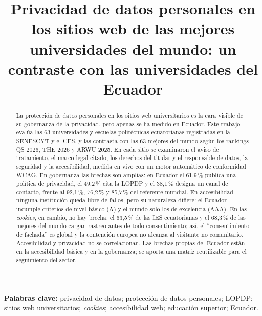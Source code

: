 \documentclass[11pt,a4paper]{article}
\title{\vspace{-1.2cm}\Large\textbf{Privacidad de datos personales en los sitios web de las mejores universidades del mundo: un contraste con las universidades del Ecuador}}
\author{}
\date{}
\begin{document}
\maketitle

\begin{abstract}
La protección de datos personales en los sitios web universitarios es la cara visible de su gobernanza de la privacidad, pero apenas se ha medido en Ecuador. Este trabajo evalúa las 63 universidades y escuelas politécnicas ecuatorianas registradas en la SENESCYT y el CES, y las contrasta con las 63 mejores del mundo según los rankings QS 2026, THE 2026 y ARWU 2025. En cada sitio se examinaron el aviso de tratamiento, el marco legal citado, los derechos del titular y el responsable de datos, la seguridad y la accesibilidad, medida en vivo con un motor automático de conformidad WCAG. En gobernanza las brechas son amplias: en Ecuador el 61,9\,\% publica una política de privacidad, el 49,2\,\% cita la LOPDP y el 38,1\,\% designa un canal de contacto, frente al 92,1\,\%, 76,2\,\% y 85,7\,\% del referente mundial. En accesibilidad ninguna institución queda libre de fallos, pero su naturaleza difiere: el Ecuador incumple criterios de nivel básico (A) y el mundo solo los de excelencia (AAA). En las \emph{cookies}, en cambio, no hay brecha: el 63,5\,\% de las IES ecuatorianas y el 68,3\,\% de las mejores del mundo cargan rastreo antes de todo consentimiento; así, el ``consentimiento de fachada'' es global y la contención europea no alcanza al visitante no comunitario. Accesibilidad y privacidad no se correlacionan. Las brechas propias del Ecuador están en la accesibilidad básica y en la gobernanza; se aporta una matriz reutilizable para el seguimiento del sector.
\end{abstract}

\noindent\textbf{Palabras clave:} privacidad de datos; protección de datos personales; LOPDP; sitios web universitarios; \emph{cookies}; accesibilidad web; educación superior; Ecuador.
\end{document}
